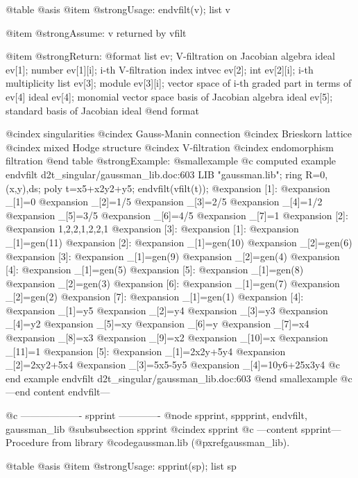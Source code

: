 @table @asis
@item @strong{Usage:}
endvfilt(v); list v

@item @strong{Assume:}
v returned by vfilt

@item @strong{Return:}
@format
list ev;  V-filtration on Jacobian algebra
  ideal ev[1];
    number ev[1][i];  i-th V-filtration index
  intvec ev[2];
    int ev[2][i];  i-th multiplicity
  list ev[3];
    module ev[3][i];  vector space of i-th graded part in terms of ev[4]
  ideal ev[4];  monomial vector space basis of Jacobian algebra
  ideal ev[5];  standard basis of Jacobian ideal
@end format

@cindex singularities
@cindex Gauss-Manin connection
@cindex Brieskorn lattice
@cindex mixed Hodge structure
@cindex V-filtration
@cindex endomorphism filtration
@end table
@strong{Example:}
@smallexample
@c computed example endvfilt d2t_singular/gaussman_lib.doc:603 
LIB "gaussman.lib";
ring R=0,(x,y),ds;
poly t=x5+x2y2+y5;
endvfilt(vfilt(t));
@expansion{} [1]:
@expansion{}    _[1]=0
@expansion{}    _[2]=1/5
@expansion{}    _[3]=2/5
@expansion{}    _[4]=1/2
@expansion{}    _[5]=3/5
@expansion{}    _[6]=4/5
@expansion{}    _[7]=1
@expansion{} [2]:
@expansion{}    1,2,2,1,2,2,1
@expansion{} [3]:
@expansion{}    [1]:
@expansion{}       _[1]=gen(11)
@expansion{}    [2]:
@expansion{}       _[1]=gen(10)
@expansion{}       _[2]=gen(6)
@expansion{}    [3]:
@expansion{}       _[1]=gen(9)
@expansion{}       _[2]=gen(4)
@expansion{}    [4]:
@expansion{}       _[1]=gen(5)
@expansion{}    [5]:
@expansion{}       _[1]=gen(8)
@expansion{}       _[2]=gen(3)
@expansion{}    [6]:
@expansion{}       _[1]=gen(7)
@expansion{}       _[2]=gen(2)
@expansion{}    [7]:
@expansion{}       _[1]=gen(1)
@expansion{} [4]:
@expansion{}    _[1]=y5
@expansion{}    _[2]=y4
@expansion{}    _[3]=y3
@expansion{}    _[4]=y2
@expansion{}    _[5]=xy
@expansion{}    _[6]=y
@expansion{}    _[7]=x4
@expansion{}    _[8]=x3
@expansion{}    _[9]=x2
@expansion{}    _[10]=x
@expansion{}    _[11]=1
@expansion{} [5]:
@expansion{}    _[1]=2x2y+5y4
@expansion{}    _[2]=2xy2+5x4
@expansion{}    _[3]=5x5-5y5
@expansion{}    _[4]=10y6+25x3y4
@c end example endvfilt d2t_singular/gaussman_lib.doc:603
@end smallexample
@c ---end content endvfilt---

@c ------------------- spprint -------------
@node spprint, sppprint, endvfilt, gaussman_lib
@subsubsection spprint
@cindex spprint
@c ---content spprint---
Procedure from library @code{gaussman.lib} (@pxref{gaussman_lib}).

@table @asis
@item @strong{Usage:}
spprint(sp); list sp

